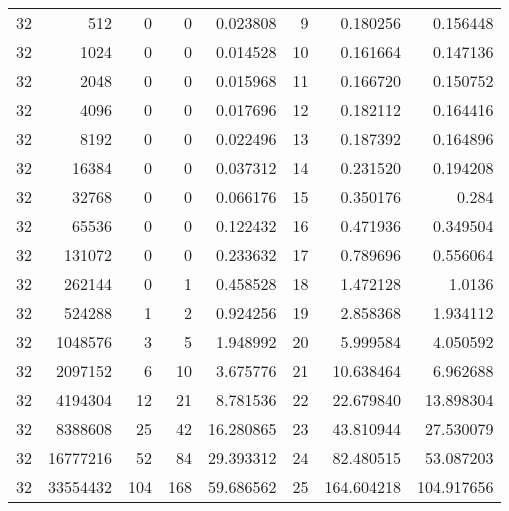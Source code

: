\begin{longtable}[c]{@{}rrrrrrrr@{}}
    32        & 512       & 0         & 0        & 0.023808    & 9                   & 0.180256    & 0.156448   \\
    32        & 1024      & 0         & 0        & 0.014528    & 10                  & 0.161664    & 0.147136   \\
    32        & 2048      & 0         & 0        & 0.015968    & 11                  & 0.166720    & 0.150752   \\
    32        & 4096      & 0         & 0        & 0.017696    & 12                  & 0.182112    & 0.164416   \\
    32        & 8192      & 0         & 0        & 0.022496    & 13                  & 0.187392    & 0.164896   \\
    32        & 16384     & 0         & 0        & 0.037312    & 14                  & 0.231520    & 0.194208   \\
    32        & 32768     & 0         & 0        & 0.066176    & 15                  & 0.350176    & 0.284      \\
    32        & 65536     & 0         & 0        & 0.122432    & 16                  & 0.471936    & 0.349504   \\
    32        & 131072    & 0         & 0        & 0.233632    & 17                  & 0.789696    & 0.556064   \\
    32        & 262144    & 0         & 1        & 0.458528    & 18                  & 1.472128    & 1.0136     \\
    32        & 524288    & 1         & 2        & 0.924256    & 19                  & 2.858368    & 1.934112   \\
    32        & 1048576   & 3         & 5        & 1.948992    & 20                  & 5.999584    & 4.050592   \\
    32        & 2097152   & 6         & 10       & 3.675776    & 21                  & 10.638464   & 6.962688   \\
    32        & 4194304   & 12        & 21       & 8.781536    & 22                  & 22.679840   & 13.898304  \\
    32        & 8388608   & 25        & 42       & 16.280865   & 23                  & 43.810944   & 27.530079  \\
    32        & 16777216  & 52        & 84       & 29.393312   & 24                  & 82.480515   & 53.087203  \\
    32        & 33554432  & 104       & 168      & 59.686562   & 25                  & 164.604218  & 104.917656 \\

\end{longtable}
